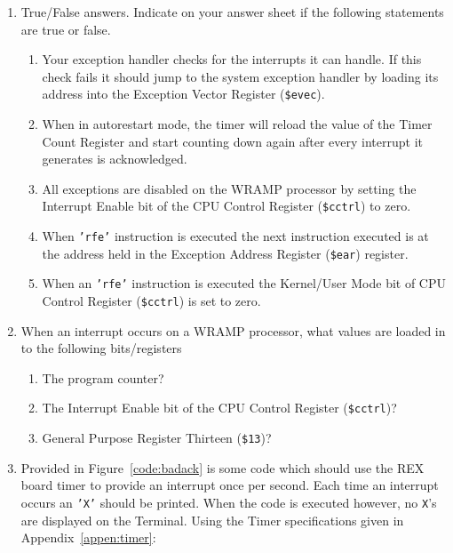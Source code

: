 \documentclass[a4paper,10pt]{article}
\begin{document}
\begin{enumerate}
\item True/False answers. Indicate on your answer sheet if the
following statements are true or false.

\begin{enumerate}

\item Your exception handler checks for the interrupts it can handle.  If this
check fails it should jump to the system exception handler by loading its
address into the Exception Vector Register (\texttt{\$evec}).

\item When in autorestart mode, the timer will reload the value of the Timer
Count Register and start counting down again after every
interrupt it generates is acknowledged.

\item All exceptions are disabled on the WRAMP processor by setting the
Interrupt Enable bit of the CPU Control Register (\texttt{\$cctrl}) to zero.

\item When \texttt{'rfe'} instruction is executed the next instruction executed is at the address
held in the Exception Address Register (\texttt{\$ear}) register.

\item When an \texttt{'rfe'} instruction is executed the Kernel/User Mode bit of
CPU Control Register (\texttt{\$cctrl}) is set to zero.

\end{enumerate}


\item When an interrupt occurs on a WRAMP processor, what values are loaded in to the
following bits/registers

\begin{enumerate}

	\item The program counter?
	
	\item The Interrupt Enable bit of the CPU Control Register
	(\texttt{\$cctrl})?
	
	\item General Purpose Register Thirteen (\texttt{\$13})?

\end{enumerate}


\item Provided in Figure~\ref{code:badack} is some code which should
use the REX board timer to provide an interrupt once per second. Each
time an interrupt occurs an \texttt{'X'} should be printed. When the code is
executed however, no \texttt{X}'s are displayed on the Terminal.  Using the
Timer specifications given in Appendix~\ref{appen:timer}:


\end{enumerate}
\end{document}

